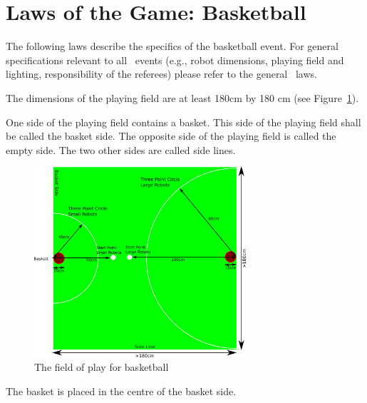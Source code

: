 \documentclass[12pt]{hurocup}
\begin{document}
\section{Laws of the Game: Basketball}
\label{sec:basketball-laws}

The following laws describe the specifics of the basketball
event. For general specifications relevant to all \HuroCup\ events
(e.g., robot dimensions, playing field and lighting, responsibility of
the referees) please refer to the general \HuroCup\ laws.

\label{bb-field}

\begin{lawlist}[BB]

\item The dimensions of the playing field are at least 180cm by
  180 cm (see Figure~\ref{fig:field-basketball}).

\item One side of the playing field contains a basket. This side of the
  playing field shall be called the basket side. The opposite side of
  the playing field is called the empty side. The two other sides are
  called side lines.

  \begin{figure}
    \begin{center}
      \includegraphics[width=0.7\textwidth]{Figures/basketball}
    \end{center}
    \caption{The field of play for basketball}
    \label{fig:field-basketball}
  \end{figure}

\item The basket is placed in the centre of the basket side.


\end{lawlist}
\end{document}
